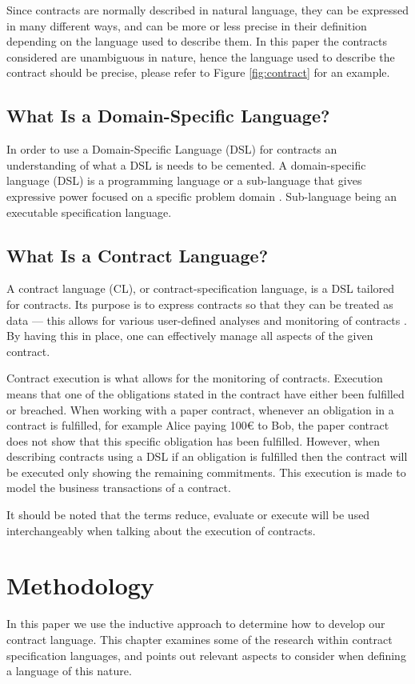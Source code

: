 \documentclass{ituthesis}
\begin{document}
Since contracts are normally described in natural language, they can be expressed in many different ways, and can be more or less precise in their definition depending on the language used to describe them. In this paper the contracts considered are unambiguous in nature, hence the language used to describe the contract should be precise, please refer to Figure \ref{fig:contract} for an example.

\section{What Is a Domain-Specific Language?}
In order to use a Domain-Specific Language (DSL) for contracts an understanding of what a DSL is needs to be cemented. A domain-specific language (DSL) is a programming language or a sub-language that gives expressive power focused on a specific problem domain \cite{whatsisadsl2005}. Sub-language being an executable specification language.

\section{What Is a Contract Language?}
A contract language (CL), or contract-specification language, is a DSL tailored for contracts. Its purpose is to express contracts so that they can be treated as data --- this allows for various user-defined analyses and monitoring of contracts \cite{andersen2006compositional}. By having this in place, one can effectively manage all aspects of the given contract.

Contract execution is what allows for the monitoring of contracts. Execution means that one of the obligations stated in the contract have either been fulfilled or breached. When working with a paper contract, whenever an obligation in a contract is fulfilled, for example Alice paying 100€ to Bob, the paper contract does not show that this specific obligation has been fulfilled. However, when describing contracts using a DSL if an obligation is fulfilled then the contract will be executed only showing the remaining commitments. This execution is made to model the business transactions of a contract.

It should be noted that the terms reduce, evaluate or execute will be used interchangeably when talking about the execution of contracts.

\chapter{Methodology}
In this paper we use the inductive approach to determine how to develop our contract language. This chapter examines some of the research within contract specification languages, and points out relevant aspects to consider when defining a language of this nature.
\end{document}
